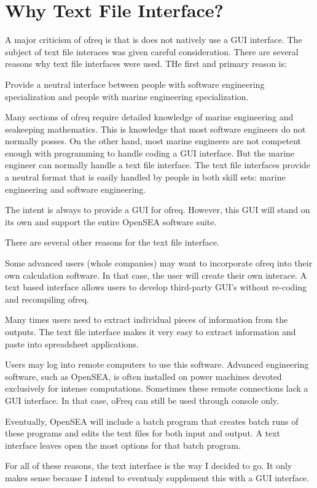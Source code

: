 \section*{Why Text File Interface?}

A major criticism of ofreq is that is does not natively use a G\-U\-I interface. The subject of text file interaces was given careful consideration. There are several reasons why text file interfaces were used. T\-He first and primary reason is\-:


\begin{DoxyItemize}
\item Provide a neutral interface between people with software engineering specialization and people with marine engineering specialization.
\end{DoxyItemize}

Many sections of ofreq require detailed knowledge of marine engineering and seakeeping mathematics. This is knowledge that most software engineers do not normally posses. On the other hand, most marine engineers are not competent enough with programming to handle coding a G\-U\-I interface. But the marine engineer can normally handle a text file interface. The text file interfaces provide a neutral format that is easily handled by people in both skill sets\-: marine engineering and software engineering.

The intent is always to provide a G\-U\-I for ofreq. However, this G\-U\-I will stand on its own and support the entire Open\-S\-E\-A software suite.

There are several other reasons for the text file interface.


\begin{DoxyEnumerate}
\item Some advanced users (whole companies) may want to incorporate ofreq into their own calculation software. In that case, the user will create their own interace. A text based interface allows users to develop third-\/party G\-U\-I's without re-\/coding and recompiling ofreq.
\item Many times users need to extract individual pieces of information from the outputs. The text file interface makes it very easy to extract information and paste into spreadsheet applications.
\item Users may log into remote computers to use this software. Advanced engineering software, such as Open\-S\-E\-A, is often installed on power machines devoted exclusively for intense computations. Sometimes these remote connections lack a G\-U\-I interface. In that case, o\-Freq can still be used through console only.
\item Eventually, Open\-S\-E\-A will include a batch program that creates batch runs of these programs and edits the text files for both input and output. A text interface leaves open the most options for that batch program.
\end{DoxyEnumerate}

For all of these reasons, the text interface is the way I decided to go. It only makes sense because I intend to eventualy supplement this with a G\-U\-I interface. 
